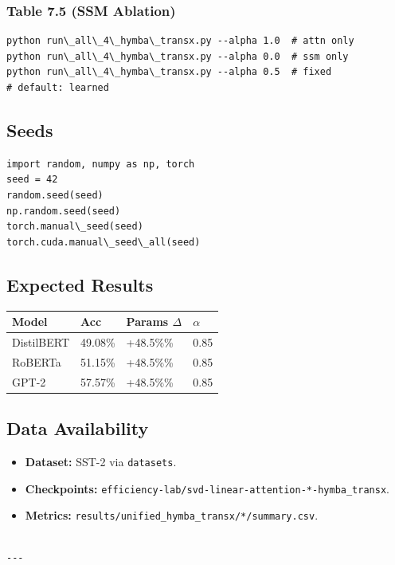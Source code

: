 \subsubsection{Table 7.5 (SSM Ablation)}
\begin{lstlisting}
python run\_all\_4\_hymba\_transx.py --alpha 1.0  # attn only
python run\_all\_4\_hymba\_transx.py --alpha 0.0  # ssm only
python run\_all\_4\_hymba\_transx.py --alpha 0.5  # fixed
# default: learned
\end{lstlisting}

\subsection{Seeds}

\begin{lstlisting}
import random, numpy as np, torch
seed = 42
random.seed(seed)
np.random.seed(seed)
torch.manual\_seed(seed)
torch.cuda.manual\_seed\_all(seed)
\end{lstlisting}

\subsection{Expected Results}

\begin{table}[H]
\centering
\small
\begin{tabular}{llll}
\toprule
\textbf{Model} & \textbf{Acc} & \textbf{Params $\Delta$} & \textbf{$\alpha$} \\
\midrule
DistilBERT & 49.08\% & +48.5\%\% & 0.85 \\
RoBERTa & 51.15\% & +48.5\%\% & 0.85 \\
GPT-2 & 57.57\% & +48.5\%\% & 0.85 \\
\bottomrule
\end{tabular}
\end{table}

\subsection{Data Availability}

\begin{itemize}
\item \textbf{Dataset:} SST-2 via \texttt{datasets}.
\item \textbf{Checkpoints:} \texttt{efficiency-lab/svd-linear-attention-*-hymba\_transx}.
\item \textbf{Metrics:} \texttt{results/unified\_hymba\_transx/*/summary.csv}.
\end{itemize}
\begin{lstlisting}

---
\end{lstlisting}